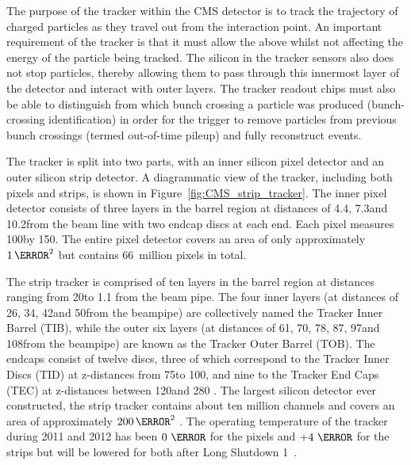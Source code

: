 The purpose of the tracker within the CMS detector is to track the trajectory of charged particles as they
travel out from the interaction point. An important requirement of the tracker is that it must allow the above
whilst not affecting the energy of the particle being tracked. The silicon in the tracker sensors also does
not stop particles, thereby allowing them to pass through this innermost layer of the detector and interact
with outer layers. The tracker readout chips must also be able to distinguish from which bunch crossing a
particle was produced (bunch-crossing identification) in order for the trigger to remove particles from
previous bunch crossings (termed out-of-time pileup) and fully reconstruct events.

The tracker is split into two parts, with an inner silicon pixel detector and an outer silicon strip detector.
A diagrammatic view of the tracker, including both pixels and strips, is shown in
Figure~\ref{fig:CMS_strip_tracker}. The inner pixel detector consists of three layers in the barrel region at
distances of 4.4\cm, 7.3\cm and 10.2\cm from the beam line with two endcap discs at each end. Each pixel
measures 100\um by 150\um. The entire pixel detector covers an area of only approximately $1\m^{2}$ but
contains 66~million pixels in total.

The strip tracker is comprised of ten layers in the barrel region at distances ranging from 20\cm to 1.1\m
from the beam pipe. The four inner layers (at distances of 26\cm, 34\cm, 42\cm and 50\cm from the beampipe)
are collectively named the Tracker Inner Barrel (TIB), while the outer six layers (at distances of 61\cm,
70\cm, 78\cm, 87\cm, 97\cm and 108\cm from the beampipe) are known as the Tracker Outer Barrel (TOB).
The endcaps consist of twelve discs, three of which correspond to the Tracker Inner Discs (TID) at z-distances
from 75\cm to 100\cm, and nine to the Tracker End Caps (TEC) at z-distances between 120\cm and 280\cm
\cite{Palmonari:1260970}. The largest silicon detector ever constructed, the strip tracker contains about ten
million channels and covers an area of approximately $200\m^{2}$ \cite{CMS_experiment,CMS_TDR1}. The operating
temperature of the tracker during 2011 and 2012 has been $0~\degreeCelsius$ for the pixels and
$+4~\degreeCelsius$ for the strips but will be lowered for both after Long Shutdown 1~\cite{Butz:1497745}.

